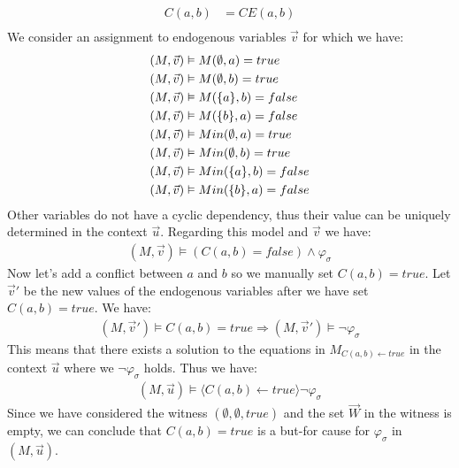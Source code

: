 \documentclass{article}
\begin{document}
\begin{example}
\begin{align*}
        C(a,b)           & = CE(a,b)                                             \\
    \end{align*}
    We consider an assignment to endogenous variables $\vec v$ for which we have:
    \begin{align*}
        (M,\vec v) & \vDash M(\emptyset,a) = true       \\
        (M,\vec v) & \vDash M(\emptyset,b) = true       \\
        (M,\vec v) & \vDash M(\{a\},b) = false   \\
        (M,\vec v) & \vDash M(\{b\},a) = false   \\
        (M,\vec v) & \vDash Min(\emptyset,a) = true     \\
        (M,\vec v) & \vDash Min(\emptyset,b) = true     \\
        (M,\vec v) & \vDash Min(\{a\},b) = false \\
        (M,\vec v) & \vDash Min(\{b\},a) = false \\
    \end{align*}
    Other variables do not have a cyclic dependency, thus their value
    can be uniquely determined in the context $\vec u$.
    Regarding this model and $\vec v$ we have:
    \begin{align*}
        (M,\vec v) \vDash (C(a,b) = false) \wedge \varphi_{\sigma}
    \end{align*}
    Now let's add a conflict between $a$ and $b$ so we manually set
    $C(a,b) = true$.
    Let $\vec v'$ be the new values of the endogenous variables
    after we have set $C(a,b) = true$.
    We have:
    \begin{align*}
        (M, \vec v') \vDash C(a,b) = true
        \Rightarrow  (M, \vec v') \vDash \neg \varphi_{\sigma}
    \end{align*}
    This means that there exists a solution to the equations in
    $M_{C(a,b) \leftarrow true}$ in the context $\vec u$ where we $\neg \varphi_{\sigma}$ holds.
    Thus we have:
    \begin{align*}
        (M, \vec u) \vDash \langle C(a,b) \leftarrow true \rangle \neg \varphi_{\sigma}
    \end{align*}
    Since we have considered the witness $(\emptyset, \emptyset, true)$
    and the set $\vec W$ in the witness is empty, we can conclude
    that $C(a,b) = true$ is a but-for cause for $\varphi_{\sigma}$
    in $(M,\vec u)$.
\end{example}
\end{document}
